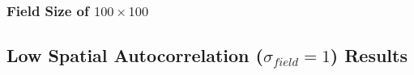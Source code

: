 
\subsubsection{Field Size of $100\times100$}

\subsection{Low Spatial Autocorrelation ($\sigma_{field} = 1$) Results}
